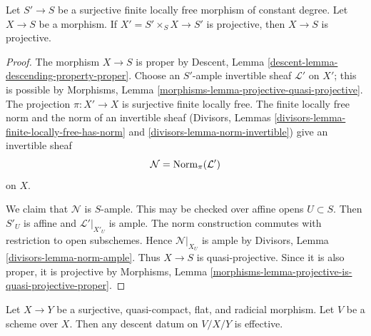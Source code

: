 \begin{lemma}
\label{lemma-projective-after-finite-locally-free-base-change}
Let $S' \to S$ be a surjective finite locally free morphism of
constant degree. Let $X \to S$ be a morphism. If
$X' = S' \times_S X \to S'$ is projective, then $X \to S$ is projective.
\end{lemma}

\begin{proof}
The morphism $X \to S$ is proper by
Descent, Lemma \ref{descent-lemma-descending-property-proper}.
Choose an $S'$-ample invertible sheaf $\mathcal{L}'$ on $X'$; this is
possible by Morphisms, Lemma
\ref{morphisms-lemma-projective-quasi-projective}. The projection
$\pi : X' \to X$ is surjective finite locally free. The finite locally
free norm and the norm of an invertible sheaf
(Divisors, Lemmas \ref{divisors-lemma-finite-locally-free-has-norm}
and \ref{divisors-lemma-norm-invertible}) give an invertible sheaf
$$
\mathcal{N} = \mathop{\rm Norm}\nolimits_\pi(\mathcal{L}')
$$
on $X$.

We claim that $\mathcal{N}$ is $S$-ample. This may be checked over affine
opens $U \subset S$. Then $S'_U$ is affine and
$\mathcal{L}'|_{X'_U}$ is ample. The norm construction commutes with
restriction to open subschemes. Hence
$\mathcal{N}|_{X_U}$ is ample by
Divisors, Lemma \ref{divisors-lemma-norm-ample}. Thus $X \to S$ is
quasi-projective. Since it is also proper, it is projective by
Morphisms, Lemma
\ref{morphisms-lemma-projective-is-quasi-projective-proper}.
\end{proof}

\begin{lemma}
\label{lemma-descend-along-fpqc-radicial}
\begin{reference}
\cite[Expos\'e 190, Th\'eor\`eme 3, p. 318]{FGA}
\end{reference}
Let $X \to Y$ be a surjective, quasi-compact, flat, and radicial morphism.
Let $V$ be a scheme over $X$. Then any descent datum on $V/X/Y$ is effective.
\end{lemma}


